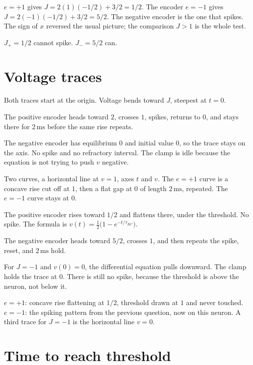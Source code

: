 \documentclass[11pt,letterpaper]{article}
\newcommand{\trc}{\tau_{RC}}
\newcommand{\ans}[1]{\par\vspace{2pt}{\bfseries #1}\quad}
\begin{document}
\ans{2.}
$e = +1$ gives $J = 2(1)(-1/2) + 3/2 = 1/2$. The encoder $e = -1$ gives $J = 2(-1)(-1/2) + 3/2 = 5/2$. The negative encoder is the one that spikes. The sign of $x$ reversed the usual picture; the comparison $J > 1$ is the whole test.
\begin{result}
$J_+ = 1/2$ cannot spike. $J_- = 5/2$ can.
\end{result}

\section{Voltage traces}

\ans{1.}
Both traces start at the origin. Voltage bends toward $J$, steepest at $t = 0$.

The positive encoder heads toward $2$, crosses $1$, spikes, returns to $0$, and stays there for $2\,\mathrm{ms}$ before the same rise repeats.

The negative encoder has equilibrium $0$ and initial value $0$, so the trace stays on the axis. No spike and no refractory interval. The clamp is idle because the equation is not trying to push $v$ negative.
\begin{sketch}
Two curves, a horizontal line at $v = 1$, axes $t$ and $v$. The $e = +1$ curve is a concave rise cut off at $1$, then a flat gap at $0$ of length $2\,\mathrm{ms}$, repeated. The $e = -1$ curve stays at $0$.
\end{sketch}

\ans{2.}
The positive encoder rises toward $1/2$ and flattens there, under the threshold. No spike. The formula is $v(t) = \tfrac12\bigl(1 - e^{-t/\trc}\bigr)$.

The negative encoder heads toward $5/2$, crosses $1$, and then repeats the spike, reset, and $2\,\mathrm{ms}$ hold.

For $J = -1$ and $v(0) = 0$, the differential equation pulls downward. The clamp holds the trace at $0$. There is still no spike, because the threshold is above the neuron, not below it.
\begin{sketch}
$e = +1$: concave rise flattening at $1/2$, threshold drawn at $1$ and never touched. $e = -1$: the spiking pattern from the previous question, now on this neuron. A third trace for $J = -1$ is the horizontal line $v = 0$.
\end{sketch}

\section{Time to reach threshold}
\end{document}
